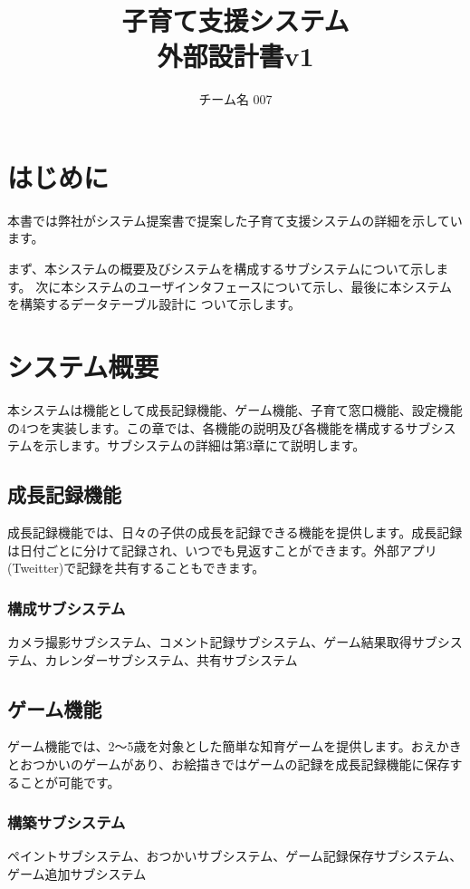 \documentclass[a4j]{jarticle}
\title{
\vspace{30mm}
{\bf 子育て支援システム}
\\
\vspace{5mm}
{\bf 外部設計書v1\\
}
\vspace{120mm}
}
\author{
\vspace{5mm}
チーム名 007\\
\vspace{5mm}
}
\begin{document}
\maketitle
\tableofcontents
\newpage

\section{はじめに}
本書では弊社がシステム提案書で提案した子育て支援システムの詳細を示しています。

まず、本システムの概要及びシステムを構成するサブシステムについて示します。
次に本システムのユーザインタフェースについて示し、最後に本システムを構築するデータテーブル設計に
ついて示します。

\section{システム概要}
本システムは機能として成長記録機能、ゲーム機能、子育て窓口機能、設定機能の4つを実装します。この章では、各機能の説明及び各機能を構成するサブシステムを示します。サブシステムの詳細は第3章にて説明します。

\subsection{成長記録機能}
成長記録機能では、日々の子供の成長を記録できる機能を提供します。成長記録は日付ごとに分けて記録され、いつでも見返すことができます。外部アプリ(Tweitter)で記録を共有することもできます。
\subsubsection*{構成サブシステム}
\noindent カメラ撮影サブシステム、コメント記録サブシステム、ゲーム結果取得サブシステム、カレンダーサブシステム、共有サブシステム

\subsection{ゲーム機能}
ゲーム機能では、2〜5歳を対象とした簡単な知育ゲームを提供します。おえかきとおつかいのゲームがあり、お絵描きではゲームの記録を成長記録機能に保存することが可能です。
\subsubsection*{構築サブシステム}
\noindent ペイントサブシステム、おつかいサブシステム、ゲーム記録保存サブシステム、ゲーム追加サブシステム
\end{document}

